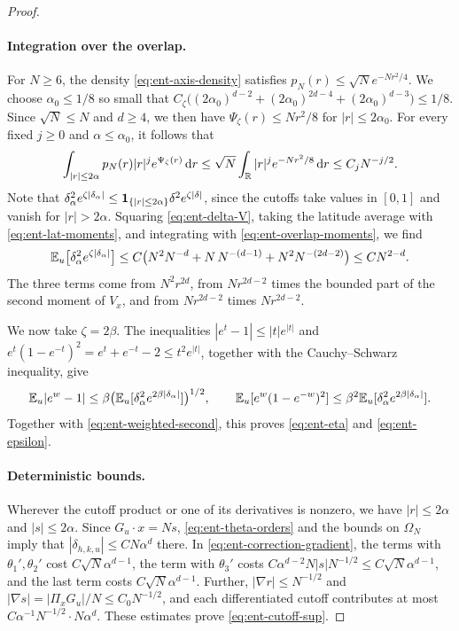 \begin{proof}
\paragraph{Integration over the overlap.}
For $N\ge6$, the density \eqref{eq:ent-axis-density} satisfies
$p_N(r)\le\sqrt Ne^{-Nr^2/4}$. We choose $\alpha_0\le1/8$ so small that
$C_\zeta\bigl((2\alpha_0)^{d-2}+(2\alpha_0)^{2d-4}+(2\alpha_0)^{d-3}\bigr)
\le1/8$. Since $\sqrt N\le N$ and $d\ge4$, we then have
$\Psi_\zeta(r)\le Nr^2/8$ for $|r|\le2\alpha_0$. For every fixed $j\ge0$ and
$\alpha\le\alpha_0$, it follows that
\begin{equation}\label{eq:ent-overlap-moments}
 \int_{|r|\le2\alpha}p_N(r)|r|^je^{\Psi_\zeta(r)}\,\mathrm d r
 \le\sqrt N\int_\mathbb R|r|^je^{-Nr^2/8}\,\mathrm d r\le C_jN^{-j/2}.
\end{equation}
Note that $\delta_\alpha^2e^{\zeta|\delta_\alpha|}\le
\mathbf 1_{\{|r|\le2\alpha\}}\delta^2e^{\zeta|\delta|}$, since the cutoffs take
values in $[0,1]$ and vanish for $|r|>2\alpha$. Squaring \eqref{eq:ent-delta-V}, taking the latitude average
with \eqref{eq:ent-lat-moments}, and integrating with
\eqref{eq:ent-overlap-moments}, we find
\begin{equation}\label{eq:ent-weighted-second}
 \mathbb E_u\bigl[\delta_\alpha^2e^{\zeta|\delta_\alpha|}\bigr]
 \le C\bigl(N^2N^{-d}+N\,N^{-(d-1)}+N^2N^{-(2d-2)}\bigr)\le CN^{2-d}.
\end{equation}
The three terms come from $N^2r^{2d}$, from $Nr^{2d-2}$ times the bounded
part of the second moment of $V_x$, and from $Nr^{2d-2}$ times
$Nr^{2d-2}$.

We now take $\zeta=2\beta$. The inequalities $|e^t-1|\le|t|e^{|t|}$ and
$e^t(1-e^{-t})^2=e^t+e^{-t}-2\le t^2e^{|t|}$, together with the
Cauchy--Schwarz inequality, give
\[
 \mathbb E_u|e^w-1|\le\beta\bigl(\mathbb E_u[\delta_\alpha^2e^{2\beta|\delta_\alpha|}]
 \bigr)^{1/2},\qquad
 \mathbb E_u[e^w(1-e^{-w})^2]\le\beta^2\mathbb E_u[\delta_\alpha^2e^{2\beta|\delta_\alpha|}].
\]
Together with \eqref{eq:ent-weighted-second}, this proves \eqref{eq:ent-eta} and
\eqref{eq:ent-epsilon}.

\paragraph{Deterministic bounds.}
Wherever the cutoff product or one of its derivatives is nonzero, we have
$|r|\le2\alpha$ and $|s|\le2\alpha$. Since $G_u\cdot x=Ns$,
\eqref{eq:ent-theta-orders} and the bounds on $\Omega_N$ imply that
$|\delta_{h,k,u}|\le CN\alpha^d$ there. In
\eqref{eq:ent-correction-gradient}, the terms with $\theta_1',\theta_2'$
cost $C\sqrt N\alpha^{d-1}$, the term with $\theta_3'$ costs
$C\alpha^{d-2}N|s|N^{-1/2}\le C\sqrt N\alpha^{d-1}$, and the last term costs
$C\sqrt N\alpha^{d-1}$. Further, $|\nabla r|\le N^{-1/2}$ and
$|\nabla s|=|\Pi_xG_u|/N\le C_0N^{-1/2}$, and each differentiated cutoff
contributes at most $C\alpha^{-1}N^{-1/2}\cdot N\alpha^d$. These estimates
prove \eqref{eq:ent-cutoff-sup}.
\end{proof}

